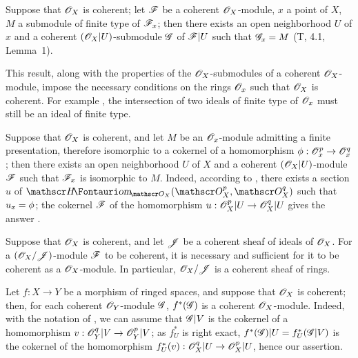 \begin{env}[5.3.8]
\label{0.5.3.8}
Suppose that $\mathscr{O}_X$ is coherent;
let $\mathscr{F}$ be a coherent $\mathscr{O}_X$-module, $x$ a point of $X$, $M$ a submodule of finite type of $\mathscr{F}_x$;
then there exists an open neighborhood $U$ of $x$ and a coherent $(\mathscr{O}_X|U)$-submodule $\mathscr{G}$ of $\mathscr{F}|U$ such that $\mathscr{G}_x=M$ (T, 4.1, Lemma~1).

This result, along with the properties of the $\mathscr{O}_X$-submodules of a coherent $\mathscr{O}_X$-module, impose the necessary conditions on the rings $\mathscr{O}_x$ such that $\mathscr{O}_X$ is coherent.
For example , the intersection of two ideals of finite type of $\mathscr{O}_x$ must still be an ideal of finite type.
\end{env}

\begin{env}[5.3.9]
\label{0.5.3.9}
Suppose that $\mathscr{O}_X$ is coherent, and let $M$ be an $\mathscr{O}_x$-module admitting a finite presentation, therefore isomorphic to a cokernel of a homomorphism $\vphi:\OO_x^p\to\OO_x^q$;
then there exists an open neighborhood $U$ of $X$ and a coherent $(\mathscr{O}_X|U)$-module $\mathscr{F}$ such that $\mathscr{F}_x$ is isomorphic to $M$.
Indeed, according to , there exists a section $u$ of $\shHom_{\OO_X}(\OO_X^p,\OO_X^q)$ such that $u_x=\phi$;
the cokernel $\mathscr{F}$ of the homomorphism $u:\OO_X^p|U\to\OO_X^q|U$ gives the answer .
\end{env}

\begin{env}[5.3.10]
\label{0.5.3.10}
Suppose that $\mathscr{O}_X$ is coherent, and let $\mathscr{J}$ be a coherent sheaf of ideals of $\mathscr{O}_X$.
For a $(\mathscr{O}_X/\mathscr{J})$-module $\mathscr{F}$ to be coherent, it is necessary and sufficient for it to be coherent as a $\mathscr{O}_X$-module.
In particular, $\mathscr{O}_X/\mathscr{J}$ is a coherent sheaf of rings.
\end{env}

\begin{env}[5.3.11]
\label{0.5.3.11}
Let $f:X\to Y$ be a morphism of ringed spaces, and suppose that $\mathscr{O}_X$ is coherent;
then, for each coherent $\mathscr{O}_Y$-module $\mathscr{G}$, $f^*(\mathscr{G})$ is a coherent $\mathscr{O}_X$-module.
Indeed, with the notation of , we can assume that $\mathscr{G}|V$ is the cokernel of a homomorphism $v:\OO_Y^q|V\to\OO_Y^p|V$;
as $f_U^*$ is right exact, $f^*(\mathscr{G})|U=f_U^*(\mathscr{G}|V)$ is the cokernel of the homomorphism $f_U^*(v):\OO_X^q|U\to\OO_X^p|U$, hence our assertion.
\end{env}

